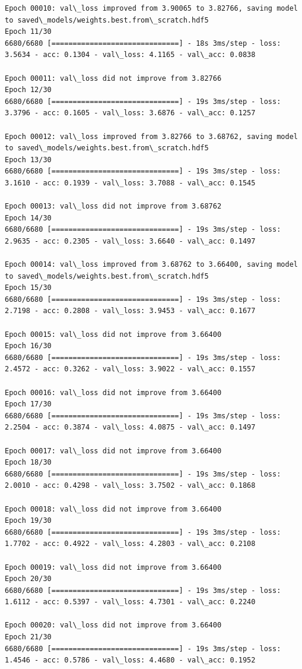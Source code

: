 \documentclass[11pt]{article}
\begin{document}
\begin{Verbatim}[commandchars=\\\{\}]
Epoch 00010: val\_loss improved from 3.90065 to 3.82766, saving model to saved\_models/weights.best.from\_scratch.hdf5
Epoch 11/30
6680/6680 [==============================] - 18s 3ms/step - loss: 3.5634 - acc: 0.1304 - val\_loss: 4.1165 - val\_acc: 0.0838

Epoch 00011: val\_loss did not improve from 3.82766
Epoch 12/30
6680/6680 [==============================] - 19s 3ms/step - loss: 3.3796 - acc: 0.1605 - val\_loss: 3.6876 - val\_acc: 0.1257

Epoch 00012: val\_loss improved from 3.82766 to 3.68762, saving model to saved\_models/weights.best.from\_scratch.hdf5
Epoch 13/30
6680/6680 [==============================] - 19s 3ms/step - loss: 3.1610 - acc: 0.1939 - val\_loss: 3.7088 - val\_acc: 0.1545

Epoch 00013: val\_loss did not improve from 3.68762
Epoch 14/30
6680/6680 [==============================] - 19s 3ms/step - loss: 2.9635 - acc: 0.2305 - val\_loss: 3.6640 - val\_acc: 0.1497

Epoch 00014: val\_loss improved from 3.68762 to 3.66400, saving model to saved\_models/weights.best.from\_scratch.hdf5
Epoch 15/30
6680/6680 [==============================] - 19s 3ms/step - loss: 2.7198 - acc: 0.2808 - val\_loss: 3.9453 - val\_acc: 0.1677

Epoch 00015: val\_loss did not improve from 3.66400
Epoch 16/30
6680/6680 [==============================] - 19s 3ms/step - loss: 2.4572 - acc: 0.3262 - val\_loss: 3.9022 - val\_acc: 0.1557

Epoch 00016: val\_loss did not improve from 3.66400
Epoch 17/30
6680/6680 [==============================] - 19s 3ms/step - loss: 2.2504 - acc: 0.3874 - val\_loss: 4.0875 - val\_acc: 0.1497

Epoch 00017: val\_loss did not improve from 3.66400
Epoch 18/30
6680/6680 [==============================] - 19s 3ms/step - loss: 2.0010 - acc: 0.4298 - val\_loss: 3.7502 - val\_acc: 0.1868

Epoch 00018: val\_loss did not improve from 3.66400
Epoch 19/30
6680/6680 [==============================] - 19s 3ms/step - loss: 1.7702 - acc: 0.4922 - val\_loss: 4.2803 - val\_acc: 0.2108

Epoch 00019: val\_loss did not improve from 3.66400
Epoch 20/30
6680/6680 [==============================] - 19s 3ms/step - loss: 1.6112 - acc: 0.5397 - val\_loss: 4.7301 - val\_acc: 0.2240

Epoch 00020: val\_loss did not improve from 3.66400
Epoch 21/30
6680/6680 [==============================] - 19s 3ms/step - loss: 1.4546 - acc: 0.5786 - val\_loss: 4.4680 - val\_acc: 0.1952


\end{Verbatim}
\end{document}

